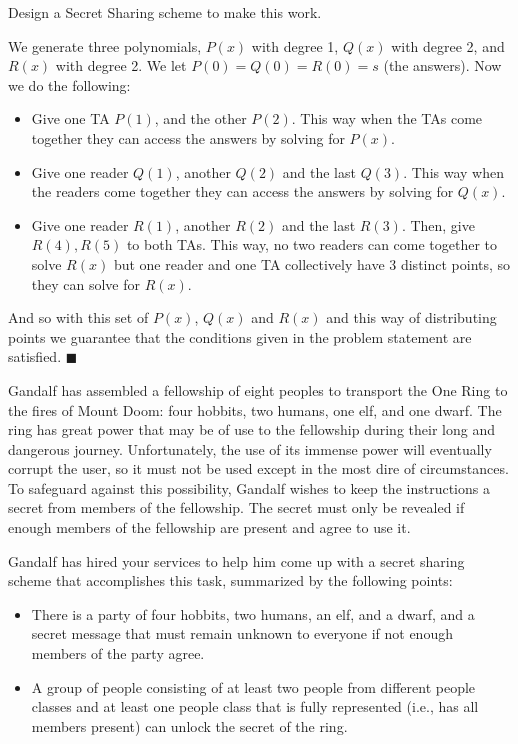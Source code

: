 \documentclass[11pt]{article}
\begin{document}
Design a Secret Sharing scheme to make this work.

\begin{solution}
    We generate three polynomials, $P(x)$ with degree 1, $Q(x)$ with degree 2, and $R(x)$ with degree 2. We let $P(0) = Q(0) = R(0) = s$ (the answers). Now we do the following: 

    \begin{itemize}
        \item Give one TA $P(1)$, and the other $P(2)$. This way when the TAs come together they can access the answers by solving for $P(x)$.
        \item Give one reader $Q(1)$, another $Q(2)$ and the last $Q(3)$. This way when the readers come together they can access the answers by solving for $Q(x)$.
        \item Give one reader $R(1)$, another $R(2)$ and the last $R(3)$. Then, give $R(4), R(5)$ to both TAs. This way, no two readers can come together to solve $R(x)$ but one reader and one TA collectively have 3 distinct points, so they can solve for $R(x)$.
    \end{itemize}

    And so with this set of $P(x)$, $Q(x)$ and $R(x)$ and this way of distributing points we guarantee that the conditions given in the problem statement are satisfied. $\blacksquare$

\end{solution}
\pagebreak
{}

Gandalf has assembled a fellowship of eight peoples to transport the One Ring to the fires of Mount Doom: four hobbits, two humans, one elf, and one dwarf. The ring has great power that may be of use to the fellowship during their long and dangerous journey. Unfortunately, the use of its immense power will eventually corrupt the user, so it must not be used except in the most dire of circumstances. To safeguard against this possibility, Gandalf wishes to keep the instructions a secret from members of the fellowship. The secret must only be revealed if enough members of the fellowship are present and agree to use it.

Gandalf has hired your services to help him come up with a secret sharing scheme that accomplishes this task, summarized by the following points:
\begin{itemize}

\item There is a party of four hobbits, two humans, an elf, and a dwarf, and a secret message that must remain unknown to everyone if not enough members of the party agree.
\item A group of people consisting of at least two people from different people classes and at least one people class that is fully represented (i.e., has all members present) can unlock the secret of the ring.

\end{itemize}
\end{document}
